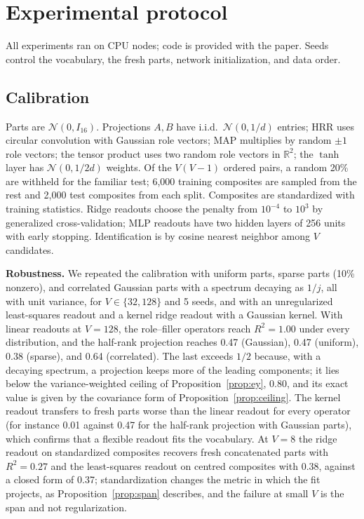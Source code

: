 \documentclass[10pt]{article}
\theoremstyle{plain}
\theoremstyle{remark}
\newcommand{\R}{\mathbb{R}}
\begin{document}
\section{Experimental protocol}
\label{app:protocol}

All experiments ran on CPU nodes; code is provided with the paper. Seeds control the vocabulary, the fresh parts, network initialization, and data order.

\subsection{Calibration}
Parts are $\mathcal{N}(0, I_{16})$. Projections $A, B$ have i.i.d.\ $\mathcal{N}(0, 1/d)$ entries; HRR uses circular convolution with Gaussian role vectors; MAP multiplies by random $\pm 1$ role vectors; the tensor product uses two random role vectors in $\R^2$; the $\tanh$ layer has $\mathcal{N}(0, 1/2d)$ weights. Of the $V(V-1)$ ordered pairs, a random 20\% are withheld for the familiar test; 6{,}000 training composites are sampled from the rest and 2{,}000 test composites from each split. Composites are standardized with training statistics. Ridge readouts choose the penalty from $10^{-4}$ to $10^{3}$ by generalized cross-validation; MLP readouts have two hidden layers of 256 units with early stopping. Identification is by cosine nearest neighbor among $V$ candidates.

\textbf{Robustness.} We repeated the calibration with uniform parts, sparse parts (10\% nonzero), and correlated Gaussian parts with a spectrum decaying as $1/j$, all with unit variance, for $V \in \{32, 128\}$ and 5 seeds, and with an unregularized least-squares readout and a kernel ridge readout with a Gaussian kernel. With linear readouts at $V = 128$, the role--filler operators reach $R^2 = 1.00$ under every distribution, and the half-rank projection reaches 0.47 (Gaussian), 0.47 (uniform), 0.38 (sparse), and 0.64 (correlated). The last exceeds $1/2$ because, with a decaying spectrum, a projection keeps more of the leading components; it lies below the variance-weighted ceiling of Proposition~\ref{prop:ey}, 0.80, and its exact value is given by the covariance form of Proposition~\ref{prop:ceiling}. The kernel readout transfers to fresh parts worse than the linear readout for every operator (for instance 0.01 against 0.47 for the half-rank projection with Gaussian parts), which confirms that a flexible readout fits the vocabulary. At $V = 8$ the ridge readout on standardized composites recovers fresh concatenated parts with $R^2 = 0.27$ and the least-squares readout on centred composites with 0.38, against a closed form of 0.37; standardization changes the metric in which the fit projects, as Proposition~\ref{prop:span} describes, and the failure at small $V$ is the span and not regularization.
\end{document}
